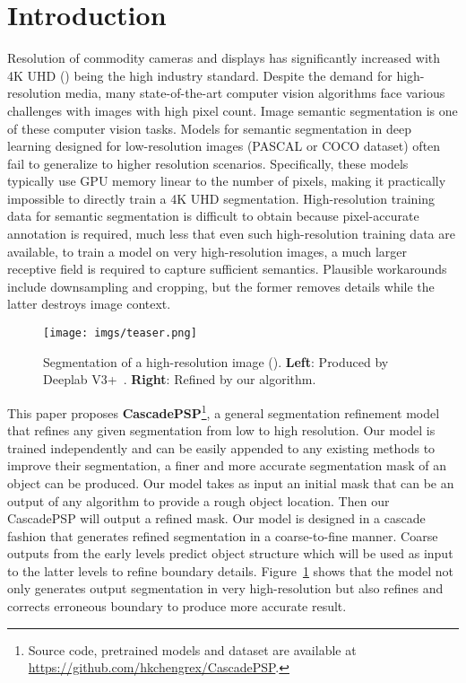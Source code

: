 \documentclass[10pt,twocolumn,letterpaper]{article}
\begin{document}
\section{Introduction}
Resolution of commodity cameras and displays has significantly increased with 4K UHD () being the high industry standard. Despite the demand for high-resolution media, many state-of-the-art computer vision algorithms face various challenges with images with high pixel count. 
Image semantic segmentation is one of these computer vision tasks. 
Models for semantic segmentation in deep learning designed for low-resolution images (\eg PASCAL or COCO dataset) often fail to generalize to higher resolution scenarios. 
Specifically, these models typically use GPU memory linear to the number of pixels, making it practically impossible to directly train a 4K UHD segmentation. 
High-resolution training data for semantic segmentation is difficult to obtain because pixel-accurate annotation is required, much less that even such high-resolution training data are available, to train a model on very high-resolution images, a much larger receptive field is required to capture sufficient semantics. Plausible workarounds include downsampling and cropping, but the former removes details while the latter destroys image context.

\begin{figure}[t]
	\texttt{[image: imgs/teaser.png]}
	\label{fig:teaser}
	\caption{
	Segmentation of a high-resolution image (). \textbf{Left}: Produced by Deeplab V3+~\cite{chen2018encoder}. \textbf{Right}: Refined by our algorithm.}
	\vspace{-0.15in}
\end{figure}

This paper proposes \textbf{CascadePSP}\footnote{Source code,  pretrained models and dataset are available at \url{https://github.com/hkchengrex/CascadePSP}.}, a general segmentation refinement model that refines any given segmentation from low to high resolution. 
Our model is trained independently and can be easily appended to any existing methods to improve their segmentation, a finer and more accurate segmentation mask of an object can be produced. 
Our model takes as input an initial mask that can be an output of any algorithm to provide a rough object location. Then our CascadePSP will output a refined mask.
Our model is designed in a cascade fashion that generates refined segmentation in a coarse-to-fine manner. Coarse outputs from the early levels predict object structure which will be used as input to the latter levels to refine boundary details. 
Figure~\ref{fig:teaser} shows that the model not only generates output segmentation in very high-resolution but also refines and corrects erroneous boundary to produce more accurate result. 
\end{document}
